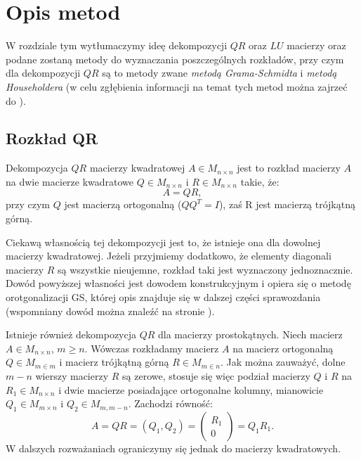 \section{Opis metod}
W rozdziale tym wytłumaczymy ideę dekompozycji $QR$ oraz $LU$ macierzy oraz
podane zostaną metody do wyznaczania poszczególnych rozkładów, przy czym dla
dekompozycji $QR$ są to metody zwane \textit{metodą Grama-Schmidta} i
\textit{metodą Householdera} (w celu zgłębienia informacji na temat tych metod można zajrzeć do \cite{NAL}).
\subsection{Rozkład QR}
Dekompozycja $QR$ macierzy kwadratowej $A \in M_{n \times n}$ jest to rozkład
macierzy $A$ na dwie macierze kwadratowe $Q \in M_{n \times n}$ i $R \in M_{n
\times n}$ takie, że:
$$A=QR,$$
przy czym $Q$ jest macierzą ortogonalną ($QQ^T=I$), zaś R jest macierzą trójkątną
górną.

Ciekawą własnością tej dekompozycji jest to, że istnieje ona dla dowolnej
macierzy kwadratowej. Jeżeli przyjmiemy dodatkowo, że elementy diagonali
macierzy $R$ są wszystkie nieujemne, rozkład taki jest wyznaczony jednoznacznie.
Dowód powyższej własności jest dowodem konstrukcyjnym
i opiera się o metodę orotgonalizacji GS, której opis znajduje się w
dalszej części sprawozdania (wspomniany dowód można znaleźć na stronie \cite{Dow}).

Istnieje również dekompozycja $QR$ dla macierzy prostokątnych. Niech macierz
$A \in M_{n \times n}$, $m \geq n$. Wówczas rozkładamy macierz $A$ na macierz
ortogonalną $Q \in M_{m \in m}$ i macierz trójkątną górną $R \in M_{m \in n}$.
Jak można zauważyć, dolne $m-n$ wierszy macierzy $R$ są zerowe, stosuje się więc
podział macierzy $Q$ i $R$ na $R_1 \in M_{n \times n}$ i dwie macierze posiadające
ortogonalne kolumny, mianowicie $Q_1 \in M_{m \times n}$ i $Q_2 \in M_{m, m-n}$.
Zachodzi równość:
$$A=QR=(Q_1, Q_2)=\begin{pmatrix} R_1 \\ 0 \end{pmatrix}=Q_1R_1.$$
W dalszych rozważaniach ograniczymy się jednak do macierzy kwadratowych.
